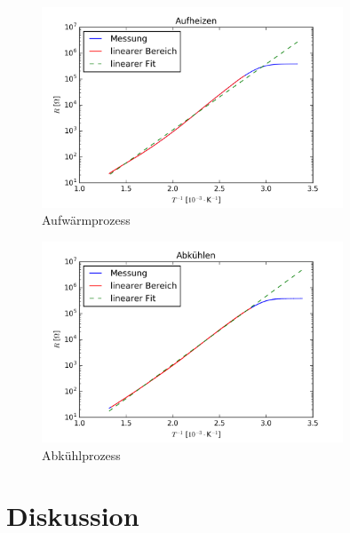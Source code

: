 \documentclass[a4paper,parskip,11pt, DIV12]{scrreprt}
\begin{document}
\begin{figure}[h]
\centering
    	\includegraphics[width=0.8\textwidth]{temp_heat.png}
	\caption{Aufwärmprozess}
	\label{temp_heat}
\end{figure}

\begin{figure}[h]
\centering
    	\includegraphics[width=0.8\textwidth]{temp_cool.png}
	\caption{Abkühlprozess}
	\label{temp_cool}
\end{figure}

\clearpage

\chapter{Diskussion}
\label{ch:Diskussion}
\end{document}
